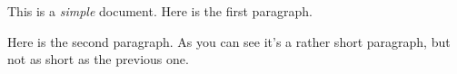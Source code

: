 \documentclass[12pt]{scrartcl}
\begin{document}
\begin{bfseries}
\large
This is a \emph{simple} document.
Here is the first paragraph.
\end{bfseries}

\begin{itshape}
Here is the second paragraph.  As you can see it's a rather short
paragraph, but not as short as the previous one.
\end{itshape}
\end{document}
